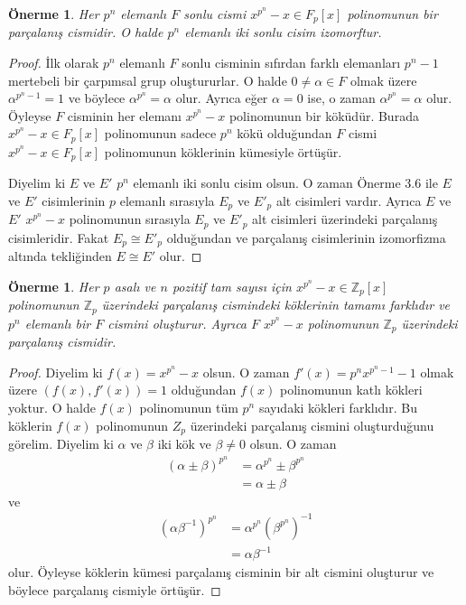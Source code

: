 \documentclass[draft]{article}
\newtheorem{prop}[thm]{Önerme}
\theoremstyle{definition}
\theoremstyle{remark}
\begin{document}
    	    \begin{prop}
    	        Her $p^n$ elemanlı $F$ sonlu cismi $x^{p^n} - x \in F_p[x]$ polinomunun bir parçalanış cismidir. O halde $p^n$ elemanlı iki sonlu cisim izomorftur.
    	    \end{prop}
    	    
    	    \begin{proof}
    	        İlk olarak $p^n$ elemanlı $F$ sonlu cisminin sıfırdan farklı elemanları $p^n - 1$ mertebeli bir çarpımsal grup oluştururlar. O halde $0 \neq \alpha \in F$ olmak üzere $\alpha^{p^n - 1} = 1$ ve böylece $\alpha^{p^n} = \alpha$ olur. Ayrıca eğer $\alpha = 0$ ise, o zaman $\alpha^{p^n} = \alpha$ olur. Öyleyse $F$ cisminin her elemanı $x^{p^n} - x$ polinomunun bir köküdür. Burada $x^{p^n} - x \in F_p[x]$ polinomunun sadece $p^n$ kökü olduğundan $F$ cismi $x^{p^n} - x \in F_p[x]$ polinomunun köklerinin kümesiyle örtüşür.\par
    	        Diyelim ki $E$ ve $E'$ $p^n$ elemanlı iki sonlu cisim olsun. O zaman Önerme 3.6 ile $E$ ve $E'$ cisimlerinin $p$ elemanlı sırasıyla $E_p$ ve $E'_p$ alt cisimleri vardır. Ayrıca $E$ ve $E'$ $x^{p^n} - x$ polinomunun sırasıyla $E_p$ ve $E'_p$ alt cisimleri üzerindeki parçalanış cisimleridir. Fakat $E_p \cong E'_p$ olduğundan ve parçalanış cisimlerinin izomorfizma altında tekliğinden $E \cong E'$ olur.
    	    \end{proof}
    	    
    	    \begin{prop}
    	        Her $p$ asalı ve $n$ pozitif tam sayısı için $x^{p^n} - x \in \mathbb{Z}_p[x]$ polinomunun $\mathbb{Z}_p$ üzerindeki parçalanış cismindeki köklerinin tamamı farklıdır ve $p^n$ elemanlı bir $F$ cismini oluşturur. Ayrıca $F$ $x^{p^n} - x$ polinomunun $\mathbb{Z}_p$ üzerindeki parçalanış cismidir.
    	    \end{prop}
    	    
    	    \begin{proof}
    	        Diyelim ki $f(x) = x^{p^n} - x$ olsun. O zaman $f'(x) = p^n x^{p^n - 1} - 1$ olmak üzere $(f(x), f'(x)) = 1$ olduğundan $f(x)$ polinomunun katlı kökleri yoktur. O halde $f(x)$ polinomunun tüm $p^n$ sayıdaki kökleri farklıdır. Bu köklerin $f(x)$ polinomunun $Z_p$ üzerindeki parçalanış cismini oluşturduğunu görelim. Diyelim ki $\alpha$ ve $\beta$ iki kök ve $\beta \neq 0$ olsun. O zaman
    	        \begin{align*}
    	            (\alpha \pm \beta)^{p^n} &= \alpha^{p^n} \pm \beta^{p^n}\\
    	            &= \alpha \pm \beta
    	        \end{align*}
    	        ve
    	        \begin{align*}
    	            (\alpha \beta^{-1})^{p^n} &= \alpha^{p^n} (\beta^{p^n})^{-1}\\
    	            &= \alpha \beta^{-1}
    	        \end{align*}
    	        olur. Öyleyse köklerin kümesi parçalanış cisminin bir alt cismini oluşturur ve böylece parçalanış cismiyle örtüşür.
    	    \end{proof}
    	    
\end{document}
